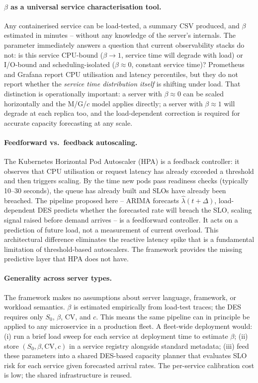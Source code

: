 \paragraph{$\beta$ as a universal service characterisation tool.}
Any containerised service can be load-tested, a summary CSV produced, and $\beta$ estimated in minutes -- without any knowledge of the server's internals. The parameter immediately answers a question that current observability stacks do not: is this service CPU-bound ($\beta \to 1$, service time will degrade with load) or I/O-bound and scheduling-isolated ($\beta \approx 0$, constant service time)? Prometheus and Grafana report CPU utilisation and latency percentiles, but they do not report whether the \emph{service time distribution itself} is shifting under load. That distinction is operationally important: a server with $\beta \approx 0$ can be scaled horizontally and the M/G/$c$ model applies directly; a server with $\beta \approx 1$ will degrade at each replica too, and the load-dependent correction is required for accurate capacity forecasting at any scale.

\paragraph{Feedforward vs.\ feedback autoscaling.}
The Kubernetes Horizontal Pod Autoscaler (HPA) is a feedback controller: it observes that CPU utilisation or request latency has already exceeded a threshold and then triggers scaling. By the time new pods pass readiness checks (typically 10--30 seconds), the queue has already built and SLOs have already been breached. The pipeline proposed here -- ARIMA forecasts $\hat{\lambda}(t+\Delta)$, load-dependent DES predicts whether the forecasted rate will breach the SLO, scaling signal raised before demand arrives -- is a feedforward controller. It acts on a prediction of future load, not a measurement of current overload. This architectural difference eliminates the reactive latency spike that is a fundamental limitation of threshold-based autoscalers. The framework provides the missing predictive layer that HPA does not have.

\paragraph{Generality across server types.}
The framework makes no assumptions about server language, framework, or workload semantics. $\beta$ is estimated empirically from load-test traces; the DES requires only $S_0$, $\beta$, CV, and $c$. This means the same pipeline can in principle be applied to any microservice in a production fleet. A fleet-wide deployment would: (i) run a brief load sweep for each service at deployment time to estimate $\beta$; (ii) store $(S_0, \beta, \text{CV}, c)$ in a service registry alongside standard metadata; (iii) feed these parameters into a shared DES-based capacity planner that evaluates SLO risk for each service given forecasted arrival rates. The per-service calibration cost is low; the shared infrastructure is reused.

